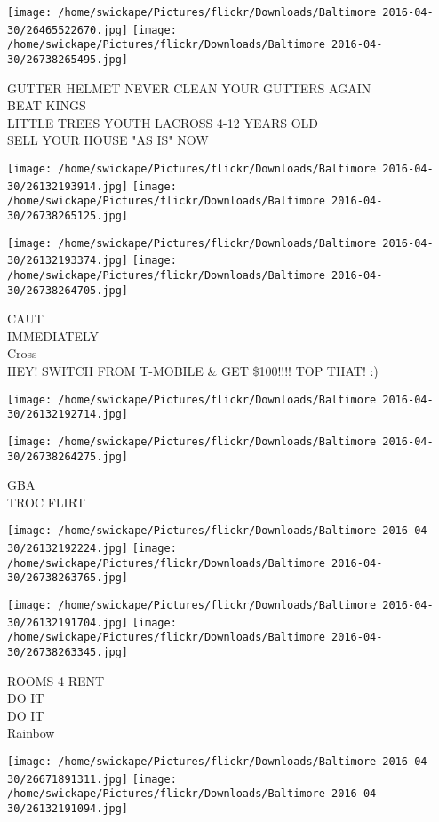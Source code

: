 \documentclass[10pt,letterpaper]{article}
\begin{document}
\texttt{[image: /home/swickape/Pictures/flickr/Downloads/Baltimore 2016-04-30/26465522670.jpg]}
\texttt{[image: /home/swickape/Pictures/flickr/Downloads/Baltimore 2016-04-30/26738265495.jpg]}

GUTTER HELMET NEVER CLEAN YOUR GUTTERS AGAIN\\
BEAT KINGS\\
LITTLE TREES YOUTH LACROSS 4{-}12 YEARS OLD\\
SELL YOUR HOUSE "AS IS" NOW
\pagebreak

\texttt{[image: /home/swickape/Pictures/flickr/Downloads/Baltimore 2016-04-30/26132193914.jpg]}
\texttt{[image: /home/swickape/Pictures/flickr/Downloads/Baltimore 2016-04-30/26738265125.jpg]}

\texttt{[image: /home/swickape/Pictures/flickr/Downloads/Baltimore 2016-04-30/26132193374.jpg]}
\texttt{[image: /home/swickape/Pictures/flickr/Downloads/Baltimore 2016-04-30/26738264705.jpg]}

CAUT\\
IMMEDIATELY\\
Cross\\
HEY!  SWITCH FROM T{-}MOBILE \& GET \$100!!!! TOP THAT! :)
\pagebreak

\texttt{[image: /home/swickape/Pictures/flickr/Downloads/Baltimore 2016-04-30/26132192714.jpg]}

\vspace{0.25in}
\texttt{[image: /home/swickape/Pictures/flickr/Downloads/Baltimore 2016-04-30/26738264275.jpg]}

GBA\\
TROC FLIRT
\pagebreak

\texttt{[image: /home/swickape/Pictures/flickr/Downloads/Baltimore 2016-04-30/26132192224.jpg]}
\texttt{[image: /home/swickape/Pictures/flickr/Downloads/Baltimore 2016-04-30/26738263765.jpg]}

\texttt{[image: /home/swickape/Pictures/flickr/Downloads/Baltimore 2016-04-30/26132191704.jpg]}
\texttt{[image: /home/swickape/Pictures/flickr/Downloads/Baltimore 2016-04-30/26738263345.jpg]}

ROOMS 4 RENT\\
DO IT\\
DO IT\\
Rainbow
\pagebreak

\texttt{[image: /home/swickape/Pictures/flickr/Downloads/Baltimore 2016-04-30/26671891311.jpg]}
\texttt{[image: /home/swickape/Pictures/flickr/Downloads/Baltimore 2016-04-30/26132191094.jpg]}
\end{document}
